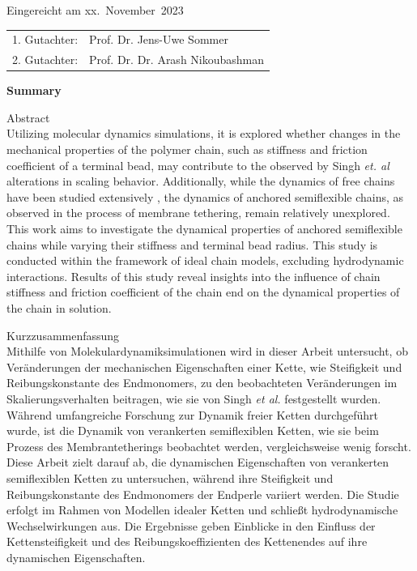 \documentclass[
    paper=A4,pagesize=automedia,fontsize=12pt,
    BCOR=15mm,DIV=22,
    twoside,headinclude,footinclude=false,
    fleqn,             %
    bibliography=totocnumbered,          %
    listof=totoc,                %
    listof=flat,                 %
    cleardoublepage=empty      %
    numbers=endperiod
]{scrartcl}
\begin{document}
\thispagestyle{empty}\vspace*{48em}

Eingereicht am xx.~November~2023\vspace{1.5em}
\par{\large\begin{tabular}{ll}
        1. Gutachter: & Prof. Dr. Jens-Uwe Sommer \\
        2. Gutachter: & Prof. Dr. Dr. Arash Nikoubashman \\
    \end{tabular}}


\newpage
\begin{center}\large\bfseries Summary\end{center}


Abstract \\
Utilizing molecular dynamics simulations, it is explored whether changes 
in the mechanical properties of the polymer chain, such as 
stiffness and friction coefficient of a terminal bead, may contribute to the 
observed by Singh \emph{et. al} \cite{Singh:2022} alterations in scaling behavior. 
Additionally, while the dynamics of free chains have been studied extensively 
\cite{Nikoubashman2016} \cite{Singh:2022}, 
the dynamics of anchored semiflexible chains, as observed in the process of 
membrane tethering, remain relatively unexplored. This work aims to investigate 
the dynamical properties of anchored semiflexible chains while varying their 
stiffness and terminal bead radius. This study is conducted within the 
framework of ideal chain models, 
excluding hydrodynamic interactions. Results of this study reveal insights 
into the influence of chain stiffness and friction coefficient of the chain end
on the dynamical properties of the chain in solution.


\vspace{15em}
Kurzzusammenfassung \\
Mithilfe von Molekulardynamiksimulationen wird in dieser Arbeit untersucht, 
ob Veränderungen der mechanischen Eigenschaften einer Kette, 
wie Steifigkeit und Reibungskonstante des Endmonomers, 
zu den beobachteten Veränderungen im Skalierungsverhalten beitragen, 
wie sie von Singh \emph{et al.} \cite{Singh:2022} festgestellt wurden. 
Während umfangreiche Forschung zur Dynamik freier Ketten 
durchgeführt wurde, ist die Dynamik von verankerten semiflexiblen Ketten, 
wie sie beim Prozess des Membrantetherings beobachtet werden, 
vergleichsweise wenig forscht. Diese Arbeit zielt darauf ab, die dynamischen 
Eigenschaften von verankerten semiflexiblen Ketten zu untersuchen, 
während ihre Steifigkeit und Reibungskonstante des Endmonomers der Endperle 
variiert werden. Die Studie erfolgt im Rahmen von Modellen idealer Ketten und schließt 
hydrodynamische Wechselwirkungen aus. Die Ergebnisse geben Einblicke in den 
Einfluss der Kettensteifigkeit und des Reibungskoeffizienten des Kettenendes auf 
ihre dynamischen Eigenschaften.
\end{document}
